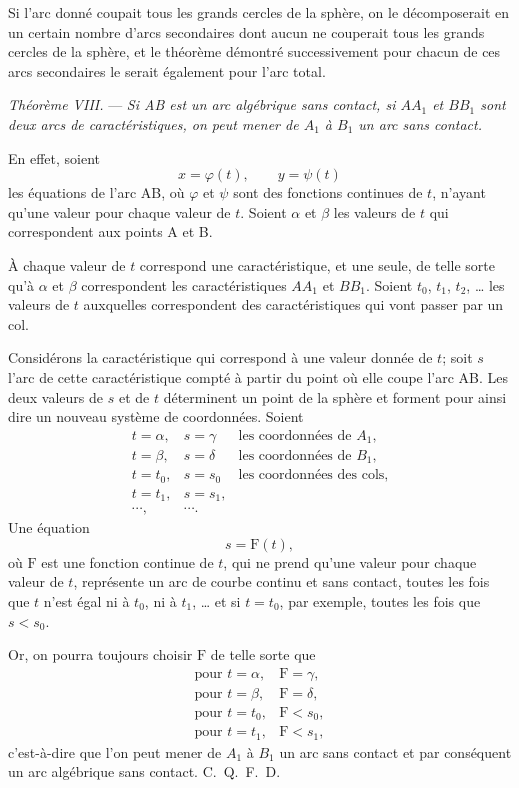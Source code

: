 \documentclass[11pt]{article}
\begin{document}
Si l’arc donné coupait tous les grands cercles de la sphère, on le décomposerait en un certain nombre d’arcs secondaires dont aucun ne couperait tous les grands cercles de la sphère, et le théorème démontré successivement pour chacun de ces arcs secondaires le serait également pour l’arc total.

\emph{Théorème VIII.} --- \emph{Si AB est un arc algébrique sans contact, si $AA_1$ et $BB_1$ sont deux arcs de caractéristiques, on peut mener de $A_1$ à $B_1$ un arc sans contact.}

En effet, soient
\[
x=\varphi(t),
\qquad
 y=\psi(t)
\]
les équations de l’arc AB, où $\varphi$ et $\psi$ sont des fonctions continues de $t$, n’ayant qu’une valeur pour chaque valeur de $t$. Soient $\alpha$ et $\beta$ les valeurs de $t$ qui correspondent aux points A et B.

À chaque valeur de $t$ correspond une caractéristique, et une seule, de telle sorte qu’à $\alpha$ et $\beta$ correspondent les caractéristiques $AA_1$ et $BB_1$. Soient $t_0$, $t_1$, $t_2$, \dots{} les valeurs de $t$ auxquelles correspondent des caractéristiques qui vont passer par un col.

Considérons la caractéristique qui correspond à une valeur donnée de $t$; soit $s$ l’arc de cette caractéristique compté à partir du point où elle coupe l’arc AB. Les deux valeurs de $s$ et de $t$ déterminent un point de la sphère et forment pour ainsi dire un nouveau système de coordonnées. Soient
\[
\begin{array}{lll}
t=\alpha, & s=\gamma & \text{les coordonnées de } A_1,\\
t=\beta,  & s=\delta & \text{les coordonnées de } B_1,\\
t=t_0,    & s=s_0    & \text{les coordonnées des cols,}\\
t=t_1,    & s=s_1,   & \\
\cdots,   & \cdots.&
\end{array}
\]
Une équation
\[
s=\mathrm F(t),
\]
où $\mathrm F$ est une fonction continue de $t$, qui ne prend qu’une valeur pour chaque valeur de $t$, représente un arc de courbe continu et sans contact, toutes les fois que $t$ n’est égal ni à $t_0$, ni à $t_1$, \dots{} et si $t=t_0$, par exemple, toutes les fois que $s<s_0$.

Or, on pourra toujours choisir $\mathrm F$ de telle sorte que
\[
\begin{array}{ll}
\text{pour } t=\alpha, & \mathrm F=\gamma,\\
\text{pour } t=\beta,  & \mathrm F=\delta,\\
\text{pour } t=t_0,    & \mathrm F<s_0,\\
\text{pour } t=t_1,    & \mathrm F<s_1,
\end{array}
\]
c’est-à-dire que l’on peut mener de $A_1$ à $B_1$ un arc sans contact et par conséquent un arc algébrique sans contact. \hfill\mbox{C. Q. F. D.}
\end{document}
